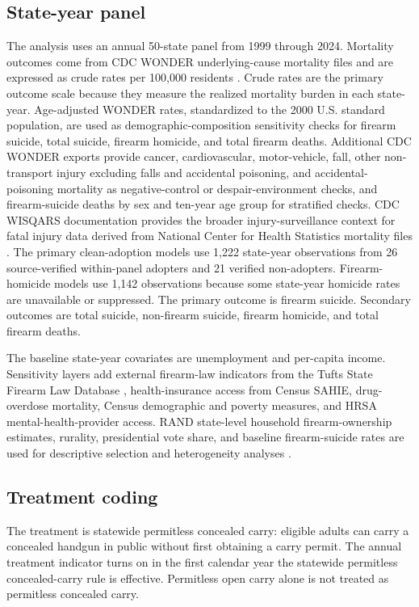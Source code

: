 \documentclass[11pt]{article}
\begin{document}
\subsection*{State-year panel}

The analysis uses an annual 50-state panel from 1999 through 2024. Mortality outcomes come from CDC WONDER underlying-cause mortality files and are expressed as crude rates per 100,000 residents \citep{cdcWonder}. Crude rates are the primary outcome scale because they measure the realized mortality burden in each state-year. Age-adjusted WONDER rates, standardized to the 2000 U.S. standard population, are used as demographic-composition sensitivity checks for firearm suicide, total suicide, firearm homicide, and total firearm deaths. Additional CDC WONDER exports provide cancer, cardiovascular, motor-vehicle, fall, other non-transport injury excluding falls and accidental poisoning, and accidental-poisoning mortality as negative-control or despair-environment checks, and firearm-suicide deaths by sex and ten-year age group for stratified checks. CDC WISQARS documentation provides the broader injury-surveillance context for fatal injury data derived from National Center for Health Statistics mortality files \citep{cdcWisqars}. The primary clean-adoption models use 1,222 state-year observations from 26 source-verified within-panel adopters and 21 verified non-adopters. Firearm-homicide models use 1,142 observations because some state-year homicide rates are unavailable or suppressed. The primary outcome is firearm suicide. Secondary outcomes are total suicide, non-firearm suicide, firearm homicide, and total firearm deaths.

The baseline state-year covariates are unemployment and per-capita income. Sensitivity layers add external firearm-law indicators from the Tufts State Firearm Law Database \citep{tuftsFirearmLaws}, health-insurance access from Census SAHIE, drug-overdose mortality, Census demographic and poverty measures, and HRSA mental-health-provider access. RAND state-level household firearm-ownership estimates, rurality, presidential vote share, and baseline firearm-suicide rates are used for descriptive selection and heterogeneity analyses \citep{randOwnership}.

\subsection*{Treatment coding}

The treatment is statewide permitless concealed carry: eligible adults can carry a concealed handgun in public without first obtaining a carry permit. The annual treatment indicator turns on in the first calendar year the statewide permitless concealed-carry rule is effective. Permitless open carry alone is not treated as permitless concealed carry.
\end{document}
